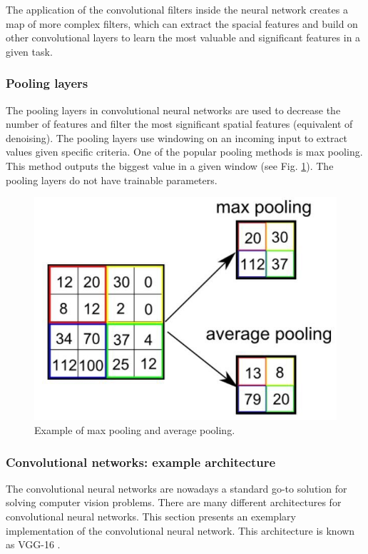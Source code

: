 The application of the convolutional filters inside the neural network creates a map of more complex filters, which can extract the spacial features and build on other convolutional layers to learn the most valuable and significant features in a given task.

\subsubsection{Pooling layers}

The pooling layers in convolutional neural networks are used to decrease the number of features and filter the most significant spatial features (equivalent of denoising). The pooling layers use windowing on an incoming input to extract values given specific criteria.
One of the popular pooling methods is max pooling.
This method outputs the biggest value in a given window (see Fig. \ref{fig:pooling_layer}).
The pooling layers do not have trainable parameters.

\begin{figure}
  \centering
  \includegraphics[width=0.6\linewidth]{figures/chapter3/avg_max_pooling.png}
  \caption{Example of max pooling and average pooling\protect\footnotemark. }
  \label{fig:pooling_layer}
\end{figure}
\subsubsection{Convolutional networks: example architecture}

The convolutional neural networks are nowadays a standard go-to solution for solving computer vision problems.
There are many different architectures for convolutional neural networks.
This section presents an exemplary implementation of the convolutional neural network.
This architecture is known as VGG-16 \cite{https://doi.org/10.48550/arxiv.1409.1556}.

